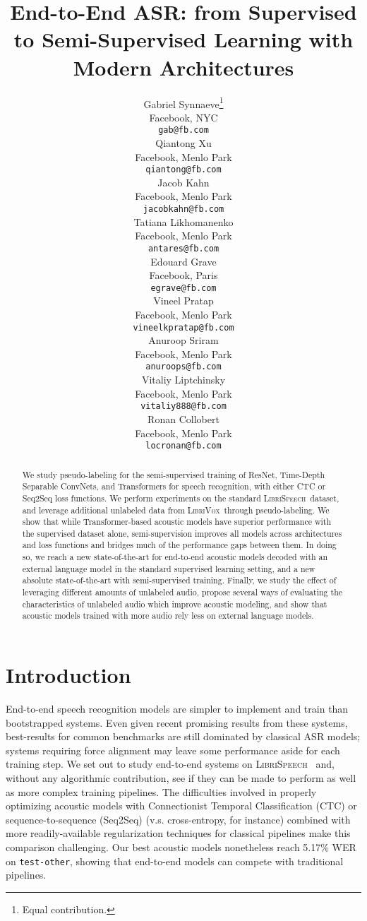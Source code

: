 \documentclass{article}
\title{End-to-End ASR: from Supervised to Semi-Supervised Learning with Modern Architectures}
\author{Gabriel Synnaeve\thanks{Equal contribution.} \\
Facebook, NYC \\
\texttt{gab@fb.com} \\
\And
Qiantong Xu \\
Facebook, Menlo Park \\
\texttt{qiantong@fb.com} \\
\And 
Jacob Kahn \\
Facebook, Menlo Park \\
\texttt{jacobkahn@fb.com} \\
\And 
Tatiana Likhomanenko \\
Facebook, Menlo Park \\
\texttt{antares@fb.com} \\
\And
Edouard Grave \\
Facebook, Paris \\
\texttt{egrave@fb.com} \\
\And
Vineel Pratap \\
Facebook, Menlo Park \\
\texttt{vineelkpratap@fb.com} \\
\And
Anuroop Sriram \\
Facebook, Menlo Park \\
\texttt{anuroops@fb.com} \\
\And
Vitaliy Liptchinsky \\
Facebook, Menlo Park \\
\texttt{vitaliy888@fb.com} \\
\And
Ronan Collobert \\
Facebook, Menlo Park \\
\texttt{locronan@fb.com} \\
}
\def\testother{\texttt{test-other}}
\newcommand{\librivox}{\textsc{LibriVox}}
\newcommand{\librispeech}{\textsc{LibriSpeech}}
\begin{document}
\maketitle
\setcounter{footnote}{0}

\begin{abstract}
We study pseudo-labeling for the semi-supervised training of ResNet, Time-Depth Separable ConvNets, and Transformers for speech recognition, with either CTC or Seq2Seq loss functions.
We perform experiments on the standard \librispeech~dataset, and leverage additional unlabeled data from \librivox~through pseudo-labeling.
We show that while Transformer-based acoustic models have superior performance with the supervised dataset alone, semi-supervision improves all models across architectures and loss functions and bridges much of the performance gaps between them.
In doing so, we reach a new state-of-the-art for end-to-end acoustic models decoded with an external language model in the standard supervised learning setting, and a new absolute state-of-the-art with semi-supervised training.
Finally, we study the effect of leveraging different amounts of unlabeled audio, propose several ways of evaluating the characteristics of unlabeled audio which improve acoustic modeling, and show that acoustic models trained with more audio rely less on external language models.
\end{abstract}

\section{Introduction}
\label{introduction}
\label{sec:intro}
End-to-end speech recognition models are simpler to implement and train than bootstrapped systems. Even given recent promising results from these systems, best-results for common benchmarks are still dominated by classical ASR models; systems requiring force alignment may leave some performance aside for each training step. We set out to study end-to-end systems on \librispeech~\cite{panayotov2015librispeech} and, without any algorithmic contribution, see if they can be made to perform as well as more complex training pipelines. The difficulties involved in properly optimizing acoustic models with Connectionist Temporal Classification (CTC) \cite{graves2006connectionist} or sequence-to-sequence (Seq2Seq) \cite{sutskever2014sequence} (v.s. cross-entropy, for instance) combined with more readily-available regularization techniques for classical pipelines make this comparison challenging. Our best acoustic models nonetheless reach 5.17\% WER on \testother, showing that end-to-end models can compete with traditional pipelines.
\end{document}
